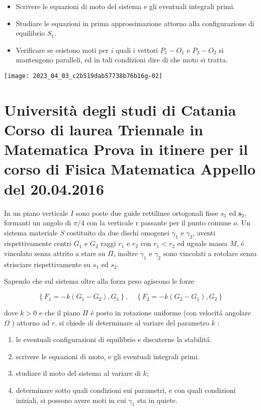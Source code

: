 \documentclass[10pt]{article}
\begin{document}
\begin{itemize}
  \item Scrivere le equazioni di moto del sistema e gli eventuali integrali primi.

  \item Studiare le equazioni in prima approssimazione attorno alla configurazione di equilibrio \(S_{1}\).

  \item Verificare se esistono moti per \(i\) quali i vettori \(P_{1}-O_{1}\) e \(P_{2}-O_{2}\) si mantengono paralleli, ed in tali condizioni dire di che moto si tratta.

\end{itemize}

\begin{center}
\texttt{[image: 2023\_04\_03\_c2b519dab57738b76b16g-02]}
\end{center}

\section{Università degli studi di Catania
Corso di laurea Triennale in Matematica
Prova in itinere per il corso di Fisica Matematica
Appello del 20.04.2016}
In un piano verticale \(I\) sono poste due guide rettilinee ortogonali fisse \(s_{1}\) ed \(\mathbf{s}_{2}\), formanti un angolo di \(\pi / 4\) con la verticale \(\mathrm{r}\) passante per il punto comune \(o\). Un sistema materiale \(S\) costituito da due dischi omogenei \(\gamma_{1}\) e \(\gamma_{2}\), aventi rispettivamente centri \(G_{1}\) e \(G_{2}\) raggi \(r_{1}\) e \(r_{2}\) con \(r_{1}<r_{2}\) ed uguale massa \(M\), é vincolato senza attrito a stare su \(\Pi\), inoltre \(\gamma_{1}\) e \(\gamma_{2}\) sono vincolati a rotolare senza strisciare rispettivamente su \(s_{1}\) ed \(s_{2}\).

Sapendo che sul sistema oltre alla forza peso agiscono le forze

\[
\left\{F_{1}=-k\left(G_{1}-G_{2}\right), G_{1}\right\}, \quad\left\{F_{2}=-k\left(G_{2}-G_{1}\right), G_{2}\right\}
\]

dove \(k>0\) e che il piano \(\Pi\) é posto in rotazione uniforme (con velocitá angolare \(\Omega\) ) attorno ad \(r\), si chiede di determinare al variare del parametro \(k\) :

\begin{enumerate}
  \item le eventuali configurazioni di equilibrio e discuterne la stabilitá.

  \item scrivere le equazioni di moto, e gli eventuali integrali primi.

  \item studiare il moto del sistema al variare di \(k\);

  \item determinare sotto quali condizioni sui parametri, e con quali condizioni iniziali, si possono avere moti in cui \(\gamma_{1}\) sta in quiete.

\end{enumerate}
\end{document}
